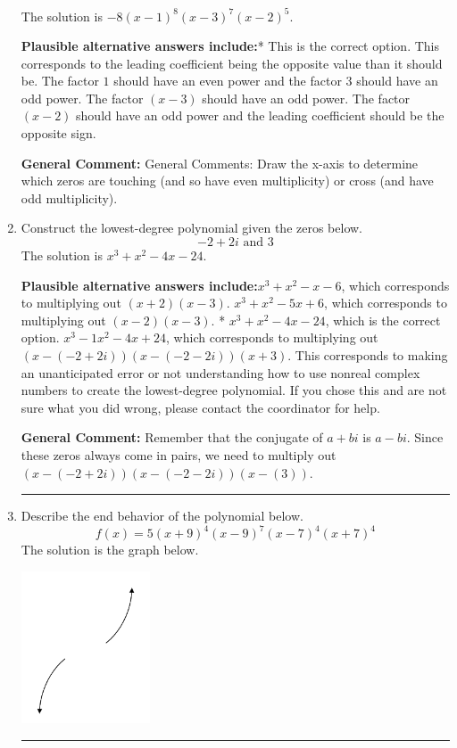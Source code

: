 \documentclass{extbook}[14pt]
\newcommand{\litem}[1]{\item #1

\rule{\textwidth}{0.4pt}}
\begin{document}
\begin{enumerate}
{The solution is \( -8(x - 1)^{8} (x - 3)^{7} (x - 2)^{5} \).\begin{enumerate}[label=\Alph*.]
\textbf{Plausible alternative answers include:}* This is the correct option.
This corresponds to the leading coefficient being the opposite value than it should be.
The factor $1$ should have an even power and the factor $3$ should have an odd power.
The factor $(x - 3)$ should have an odd power.
The factor $(x - 2)$ should have an odd power and the leading coefficient should be the opposite sign.
\end{enumerate}

\textbf{General Comment:} General Comments: Draw the x-axis to determine which zeros are touching (and so have even multiplicity) or cross (and have odd multiplicity).
}
\litem{
Construct the lowest-degree polynomial given the zeros below.
\[ -2 + 2 i \text{ and } 3 \]The solution is \( x^{3} + x^{2} -4 x -24 \).\begin{enumerate}[label=\Alph*.]
\textbf{Plausible alternative answers include:}$x^{3} + x^{2} -x -6$, which corresponds to multiplying out $(x + 2)(x -3)$.
$x^{3} + x^{2} -5 x + 6$, which corresponds to multiplying out $(x -2)(x -3)$.
* $x^{3} + x^{2} -4 x -24$, which is the correct option.
$x^{3} -1 x^{2} -4 x + 24$, which corresponds to multiplying out $(x-(-2 + 2 i))(x-(-2 - 2 i))(x + 3)$.
This corresponds to making an unanticipated error or not understanding how to use nonreal complex numbers to create the lowest-degree polynomial. If you chose this and are not sure what you did wrong, please contact the coordinator for help.
\end{enumerate}

\textbf{General Comment:} Remember that the conjugate of $a+bi$ is $a-bi$. Since these zeros always come in pairs, we need to multiply out $(x-(-2 + 2 i))(x-(-2 - 2 i))(x-(3))$.
}
\litem{
Describe the end behavior of the polynomial below.
\[ f(x) = 5(x + 9)^{4}(x - 9)^{7}(x - 7)^{4}(x + 7)^{4} \]The solution is the graph below.
    \begin{center}
        \includegraphics[width=0.3\textwidth]{../Figures/polyEndBehaviorDB.png}
    \end{center}

}
\end{enumerate}
\end{document}
